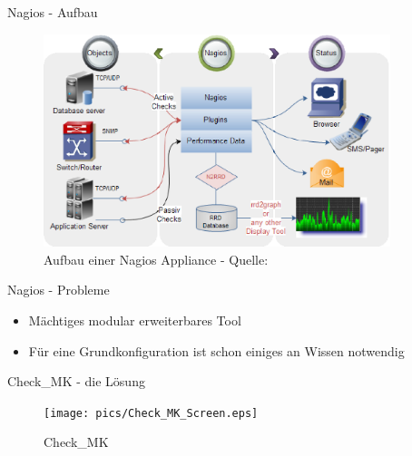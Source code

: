 \documentclass[12pt]{beamer}
\begin{document}
\begin{frame}{Nagios - Aufbau}
	\begin{figure}
		\centering
		\includegraphics[width=0.9\textwidth]{pics/NagiosMonitoring.eps}
		\caption[Grober Aufbau von Nagios]{Aufbau einer Nagios Appliance - Quelle: \textcite{nagiosaufbau}}
	\end{figure}
\end{frame}
\begin{frame}{Nagios - Probleme}
	\begin{itemize}
		\item Mächtiges modular erweiterbares Tool
		\item Für eine Grundkonfiguration ist schon einiges an Wissen notwendig
	\end{itemize}
\end{frame}
\begin{frame}{Check\_MK - die Lösung}
	\begin{figure}
		\centering
		\texttt{[image: pics/Check\_MK\_Screen.eps]}
		\caption[Check\_MK]{Check\_MK}
	\end{figure}
\end{frame}
\end{document}
